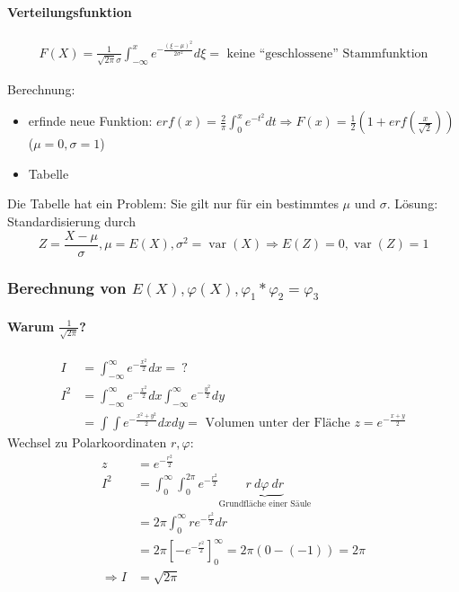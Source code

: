 \documentclass[10pt,a4paper]{scrartcl}
\DeclareMathOperator{\var}{var}
\begin{document}
\paragraph{Verteilungsfunktion}
\begin{align*}
F(X) = \frac{1}{\sqrt{2\pi}\sigma} \int_{-\infty}^x e^{-\frac{(\xi-\mu)^2}{2\sigma^2}} d\xi = \text{ keine ``geschlossene'' Stammfunktion}
\end{align*}

Berechnung:
\begin{itemize}
\item erfinde neue Funktion: $erf(x) = \frac{2}{\pi} \int_0^x e^{-t^2}dt \Rightarrow F(x) 
         = \frac{1}{2}\left(1 + erf\left(\frac{x}{\sqrt{2}}\right)\right)$ ($\mu = 0, \sigma = 1$)
\item Tabelle
\end{itemize}

Die Tabelle hat ein Problem: Sie gilt nur für ein bestimmtes $\mu$ und $\sigma$.
Lösung: Standardisierung durch $$Z = \frac{X - \mu}{\sigma}, \mu = E(X), \sigma^2 = \var(X) \Longrightarrow E(Z) = 0, \var(Z) = 1$$ 

\subsubsection{Berechnung von $E(X), \varphi(X), \varphi_1 * \varphi_2 = \varphi_3$}
\paragraph{Warum $\frac{1}{\sqrt{2\pi}}$?}
\begin{align*}
I & = \int_{-\infty}^\infty e^{-\frac{x^2}{2}} dx = \ ? \\
I^2 & = \int_{-\infty}^\infty e^{-\frac{x^2}{2}} dx \int_{-\infty}^\infty e^{-\frac{y^2}{2}} dy \\
    & = \int \int e^{-\frac{x^2 + y^2}{2}} dx dy = \text{ Volumen unter der Fläche } z = e^{-\frac{x+y}{2}}
\end{align*}
Wechsel zu Polarkoordinaten $r, \varphi$:
\begin{align*}
z & = e^{-\frac{r^2}{2}} \\
I^2 & = \int_0^\infty \int_0^{2\pi} e^{-\frac{r^2}{2}} \underbrace{r\ d\varphi\ dr}_{\text{Grundfläche einer Säule}} \\
    & = 2\pi \int_0^\infty re^{-\frac{r^2}{2}} dr \\
    & = 2\pi \left[ -e^{-\frac{r^2}{2}} \right]_0^\infty = 2\pi (0 - (-1)) = 2\pi \\
\Rightarrow I &= \sqrt{2\pi}
\end{align*}
\end{document}
